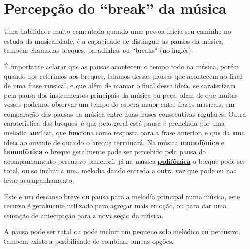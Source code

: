 \section{Percepção do ``break'' da música}
\label{sec:percepcionbreak}

Uma habilidade muito comentada quando uma pessoa inicia seu caminho no estudo da musicalidade,
é a capacidade de distinguir as pausas da música, 
também chamadas breques, paradinhas ou ``breaks'' (no inglês).

É importante aclarar que as pausas acontecem o tempo todo na  música,
porém quando nos referimos aos breques, 
falamos dessas pausas que acontecem ao final de uma frase musical,
e que além de marcar o final dessa ideia,
se caraterizam pela pausa dos instrumentos principais da música ou peça,
alem de que muitas vesses podemos observar um tempo de espera maior entre frases musicais, 
em comparação das pausas da música entre duas frases consecutivas regulares.
Outra carateristica dos breques, 
é que pelo geral está pausa é prenchida por uma melodia auxiliar,
que funciona como resposta para a frase anterior, e que da uma ideia ao ouvinte de quando o breque terminará.
Na música \hyperref[subsec:monofonica]{\textbf{monofônica}} e \hyperref[subsec:homofonica]{\textbf{homofônica}} 
o breque geralmente pode ser percebido pela pausa do acompanhamento percusivo principal;
já na música \hyperref[subsec:polifonica]{\textbf{polifônica}} o breque pode ser total,
ou so incluir a uma melodia dando entreda a outra voz que pode ou nao levar acompanhamento.
\begin{definition}
Este é um descanso breve ou pausa para a melodía principal numa música,
este recurso é geralmente utilizado para agregar mais emoção,
ou para dar uma sensação de antecipação para a nova seção da música. 

A pausa pode ser total ou pode incluir um pequeno solo melódico ou percusivo, 
tambem existe a posibilidade de combinar ambas opções.
\end{definition}

